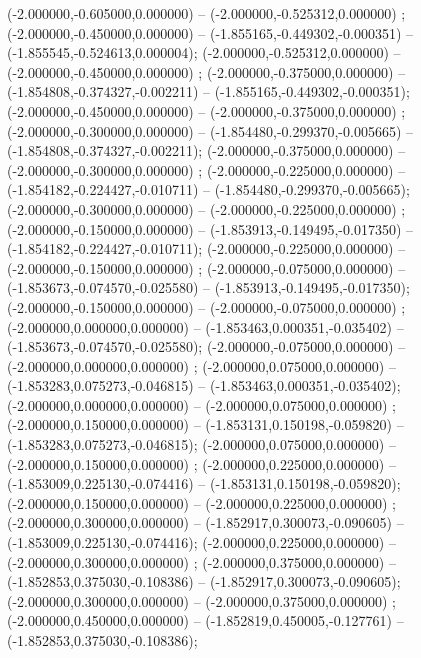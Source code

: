  (-2.000000,-0.605000,0.000000) -- (-2.000000,-0.525312,0.000000) ;
 (-2.000000,-0.450000,0.000000) -- (-1.855165,-0.449302,-0.000351) -- (-1.855545,-0.524613,0.000004);
 (-2.000000,-0.525312,0.000000) -- (-2.000000,-0.450000,0.000000) ;
 (-2.000000,-0.375000,0.000000) -- (-1.854808,-0.374327,-0.002211) -- (-1.855165,-0.449302,-0.000351);
 (-2.000000,-0.450000,0.000000) -- (-2.000000,-0.375000,0.000000) ;
 (-2.000000,-0.300000,0.000000) -- (-1.854480,-0.299370,-0.005665) -- (-1.854808,-0.374327,-0.002211);
 (-2.000000,-0.375000,0.000000) -- (-2.000000,-0.300000,0.000000) ;
 (-2.000000,-0.225000,0.000000) -- (-1.854182,-0.224427,-0.010711) -- (-1.854480,-0.299370,-0.005665);
 (-2.000000,-0.300000,0.000000) -- (-2.000000,-0.225000,0.000000) ;
 (-2.000000,-0.150000,0.000000) -- (-1.853913,-0.149495,-0.017350) -- (-1.854182,-0.224427,-0.010711);
 (-2.000000,-0.225000,0.000000) -- (-2.000000,-0.150000,0.000000) ;
 (-2.000000,-0.075000,0.000000) -- (-1.853673,-0.074570,-0.025580) -- (-1.853913,-0.149495,-0.017350);
 (-2.000000,-0.150000,0.000000) -- (-2.000000,-0.075000,0.000000) ;
 (-2.000000,0.000000,0.000000) -- (-1.853463,0.000351,-0.035402) -- (-1.853673,-0.074570,-0.025580);
 (-2.000000,-0.075000,0.000000) -- (-2.000000,0.000000,0.000000) ;
 (-2.000000,0.075000,0.000000) -- (-1.853283,0.075273,-0.046815) -- (-1.853463,0.000351,-0.035402);
 (-2.000000,0.000000,0.000000) -- (-2.000000,0.075000,0.000000) ;
 (-2.000000,0.150000,0.000000) -- (-1.853131,0.150198,-0.059820) -- (-1.853283,0.075273,-0.046815);
 (-2.000000,0.075000,0.000000) -- (-2.000000,0.150000,0.000000) ;
 (-2.000000,0.225000,0.000000) -- (-1.853009,0.225130,-0.074416) -- (-1.853131,0.150198,-0.059820);
 (-2.000000,0.150000,0.000000) -- (-2.000000,0.225000,0.000000) ;
 (-2.000000,0.300000,0.000000) -- (-1.852917,0.300073,-0.090605) -- (-1.853009,0.225130,-0.074416);
 (-2.000000,0.225000,0.000000) -- (-2.000000,0.300000,0.000000) ;
 (-2.000000,0.375000,0.000000) -- (-1.852853,0.375030,-0.108386) -- (-1.852917,0.300073,-0.090605);
 (-2.000000,0.300000,0.000000) -- (-2.000000,0.375000,0.000000) ;
 (-2.000000,0.450000,0.000000) -- (-1.852819,0.450005,-0.127761) -- (-1.852853,0.375030,-0.108386);

